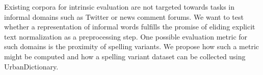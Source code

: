 Existing corpora for intrinsic evaluation are not targeted towards tasks in informal domains such as Twitter or news comment forums. We want to test whether a representation of informal words fulfills the promise of eliding explicit text normalization as a preprocessing step. One possible evaluation metric for such domains is the proximity of spelling variants. We propose how such a metric might be computed and how a spelling variant dataset can be collected using UrbanDictionary.
